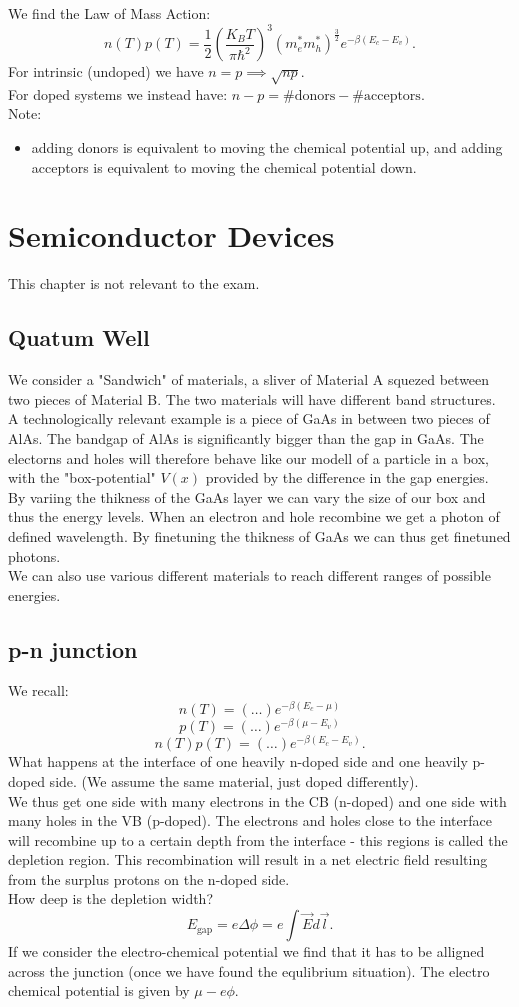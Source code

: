 \documentclass{report}
\begin{document}
We find the Law of Mass Action: \[
	n(T) p(T) = \frac{1}{2} \left(\frac{K_B T}{\pi \hbar^2}  \right)^3 \left( m_e^* m_h^* \right) ^{\frac{3}{2}} e^{-\beta \left(E_c - E_v  \right) }
.\] For intrinsic (undoped) we have $n = p \implies \sqrt{np} $.\\
For doped systems we instead have: $n - p = \text{\#donors} - \text{\#acceptors}$.\\
Note: 
\begin{itemize}
	\item adding donors is equivalent to moving the chemical potential up, and adding acceptors is equivalent to moving the chemical potential down.
\end{itemize}
\chapter{Semiconductor Devices}
This chapter is not relevant to the exam.
\section{Quatum Well}
We consider a "Sandwich" of materials, a sliver of Material A squezed between two pieces of Material B. The two materials will have different band structures.\\
A technologically relevant example is a piece of GaAs in between two pieces of AlAs. The bandgap of AlAs is significantly bigger than the gap in GaAs. The electorns and holes will therefore behave like our modell of a particle in a box, with the "box-potential" $V(x)$ provided by the difference in the gap energies.\\
By variing the thikness of the GaAs layer we can vary the size of our box and thus the energy levels. When an electron and hole recombine we get a photon of defined wavelength. By finetuning the thikness of GaAs we can thus get finetuned photons.\\
We can also use various different materials to reach different ranges of possible energies.
\section{p-n junction}
We recall: \[
	n(T) = \left( \ldots \right) e^{-\beta \left( E_c - \mu \right)}
\] \[
p(T) = \left( \ldots \right) e^{-\beta \left( \mu - E_v \right) }
\] \[
n(T) p(T) = \left( \ldots \right) e^{-\beta\left( E_c - E_v \right)} 
.\]   
What happens at the interface of one heavily n-doped side and one heavily p-doped side. (We assume the same material, just doped differently).\\
We thus get one side with many electrons in the CB (n-doped) and one side with many holes in the VB (p-doped). The electrons and holes close to the interface will recombine up to a certain depth from the interface - this regions is called the depletion region. This recombination will result in a net electric field resulting from the surplus protons on the n-doped side.\\
How deep is the depletion width? \[
E_\text{gap} = e \Delta \phi = e \int \vec{E} d\vec{l}
.\] 
If we consider the electro-chemical potential we find that it has to be alligned across the junction (once we have found the equlibrium situation). The electro chemical potential is given by $\mu - e \phi$.
\end{document}

